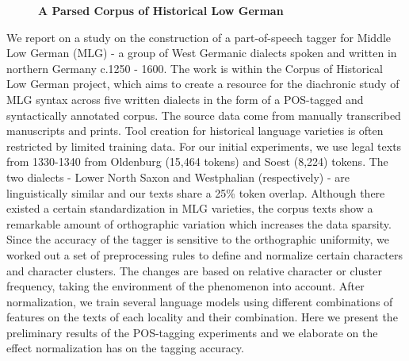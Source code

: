 \documentclass[10pt, a4paper, twopage, headinclude, footinclude, BCOR5mm]{book}
\begin{document}
\newpage

\begin{figure}[t!]
\centering
\large\textbf{A Parsed Corpus of Historical Low German}
\vspace*{0.5cm}
\end{figure}


\begin{table}[t!]
\end{table} 
\noindent
We report on a study on the construction of a part-of-speech tagger for Middle Low German (MLG) - a group of West Germanic dialects spoken and written in northern Germany c.1250 - 1600. The work is within the Corpus of Historical Low German project, which aims to create a resource for the diachronic study of MLG syntax across five written dialects in the form of a POS-tagged and syntactically annotated corpus. The source data come from manually transcribed manuscripts and prints.  Tool creation for historical language varieties is often restricted by limited training data. For our initial experiments, we use legal texts from 1330-1340 from Oldenburg (15,464 tokens) and Soest (8,224) tokens. The two dialects - Lower North Saxon and Westphalian (respectively) - are linguistically similar and our texts share a 25\% token overlap.  Although there existed a certain standardization in MLG varieties, the corpus texts show a remarkable amount of orthographic variation which increases the data sparsity. Since the accuracy of the tagger is sensitive to the orthographic uniformity, we worked out a set of preprocessing rules to define and normalize certain characters and character clusters. The changes are based on relative character or cluster frequency, taking the environment of the phenomenon into account.  After normalization, we train several language models using different combinations of features on the texts of each locality and their combination. Here we present the preliminary results of the POS-tagging experiments and we elaborate on the effect normalization has on the tagging accuracy.  
\end{document}
